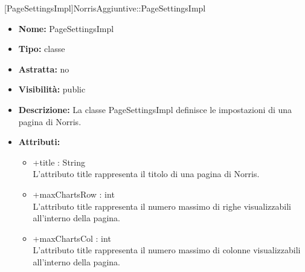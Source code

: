 			[PageSettingsImpl]{NorrisAggiuntive::PageSettingsImpl}
			

	
			
			\begin{itemize}
			\item \textbf{Nome:} PageSettingsImpl
			\item \textbf{Tipo:} classe
			
		\item \textbf{Astratta:}
		no
			\item \textbf{Visibilità:} public
			\item \textbf{Descrizione:} La classe PageSettingsImpl definisce le impostazioni di una pagina di Norris.
			\item \textbf{Attributi:}
				\begin{itemize}
				\setlength{\itemsep}{5pt}
				
					\item[\ding{111}] {+title : String} \\ [1mm] L'attributo title rappresenta il titolo di una pagina di Norris.
					\item[\ding{111}] {+maxChartsRow : int} \\ [1mm] L'attributo title rappresenta il numero massimo di righe visualizzabili all'interno della pagina.
					\item[\ding{111}] {+maxChartsCol : int} \\ [1mm] L'attributo title rappresenta il numero massimo di colonne visualizzabili all'interno della pagina.
				\end{itemize}
		
			\end{itemize}
	